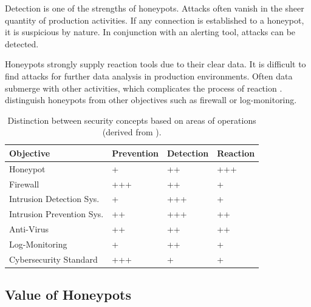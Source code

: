 Detection is one of the strengths of honeypots.
Attacks often vanish in the sheer quantity of production activities.
If any connection is established to a honeypot, it is suspicious by nature.
In conjunction with an alerting tool, attacks can be detected.

Honeypots strongly supply reaction tools due to their clear data.
It is difficult to find attacks for further data analysis in production environments.
Often data submerge with other activities, which complicates the process of reaction \cite{NawrockiWSKS2016}.
\citet{NawrockiWSKS2016} distinguish honeypots from other objectives such as firewall or log-monitoring.

\begin{table}
    \centering
    \caption[Distinction between security concepts]{
        Distinction between security concepts based on areas of operations (derived from \cite{NawrockiWSKS2016}).
    }
    \begin{tabular}{l|lll}
        \toprule
        \textbf{Objective}        & \textbf{Prevention} & \textbf{Detection} & \textbf{Reaction} \\ \hline
        Honeypot                  & +                   & ++                 & +++               \\
        Firewall                  & +++                 & ++                 & +                 \\
        Intrusion Detection Sys.  & +                   & +++                & +                 \\
        Intrusion Prevention Sys. & ++                  & +++                & ++                \\
        Anti-Virus                & ++                  & ++                 & ++                \\
        Log-Monitoring            & +                   & ++                 & +                 \\
        Cybersecurity Standard    & +++                 & +                  & +                 \\
        \bottomrule
    \end{tabular}
    \label{tab:honeypots-security-concepts}
\end{table}

\subsection{Value of Honeypots}

